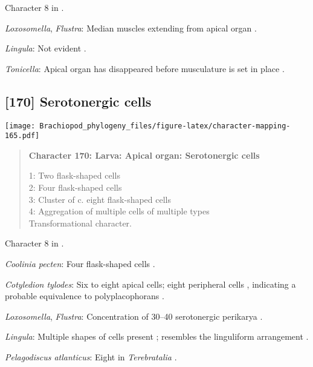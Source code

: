 \documentclass[openany]{book}
\theoremstyle{definition}
\theoremstyle{definition}
\theoremstyle{definition}
\theoremstyle{remark}
\begin{document}
Character 8 in \citet{Vinther2008}.

\hypertarget{Flustra-coding-169}{}
\emph{Loxosomella}, \emph{Flustra}: Median muscles extending from apical
organ \citep{Gruhl2008}.

\hypertarget{Lingula-coding-169}{}
\emph{Lingula}: Not evident \citep[fig. 2C]{Santagata2004}.

\hypertarget{Tonicella-coding-169}{}
\emph{Tonicella}: Apical organ has disappeared before musculature is set
in place \citep{Wanninger2002M}.

\subsection*{{[}170{]} Serotonergic cells}\label{serotonergic-cells}

\texttt{[image: Brachiopod\_phylogeny\_files/figure-latex/character-mapping-165.pdf]}

\begin{quote}
\textbf{Character 170: Larva: Apical organ: Serotonergic cells}

1: Two flask-shaped cells\\
2: Four flask-shaped cells\\
3: Cluster of c. eight flask-shaped cells\\
4: Aggregation of multiple cells of multiple types\\
Transformational character.
\end{quote}

Character 8 in \citet{Haszprunar2008}.

\hypertarget{Coolinia_pecten-coding-170}{}
\emph{Coolinia pecten}: Four flask-shaped cells \citep{Altenburger2010}.

\hypertarget{Cotyledion_tylodes-coding-170}{}
\emph{Cotyledion tylodes}: Six to eight apical cells; eight peripheral
cells \citep{Wanninger2007}, indicating a probable equivalence to
polyplacophorans \citep{Haszprunar2008}.

\hypertarget{Flustra-coding-170}{}
\emph{Loxosomella}, \emph{Flustra}: Concentration of 30--40 serotonergic
perikarya \citep[in \emph{Fredericella};][]{Gruhl2010F}.

\hypertarget{Lingula-coding-170}{}
\emph{Lingula}: Multiple shapes of cells present \citep{Santagata2002};
resembles the linguliform arrangement \citep{Altenburger2010}.

\hypertarget{Pelagodiscus_atlanticus-coding-170}{}
\emph{Pelagodiscus atlanticus}: Eight in \emph{Terebratalia}
\citep{Luter2016}.
\end{document}
